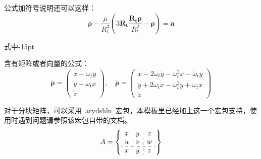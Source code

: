 公式加符号说明还可以这样：
\begin{equation}\label{eq:111}
\ddot{\boldsymbol{\rho}}-\frac{\mu}{R_{t}^{3}}\left( 3\mathbf{R_{t}}\frac{\mathbf{R_{t}\rho}}{R_{t}^{2}}-\boldsymbol{\rho}\right)=\mathbf{a}
\end{equation}
\begin{formulasymb}{式中}{-15pt}%
\end{formulasymb}

含有矩阵或者向量的公式：
\begin{equation}\label{eq:rho}
\dot{\boldsymbol{\rho}}=\left( \begin{array}{c}
\dot{x}-\omega_{t}y\\\dot{y}+\omega_{t}x\\\dot{z}
\end{array}\right) , \quad
\ddot{\boldsymbol{\rho}}=\left( \begin{array}{c}
\ddot{x}-2\omega_{t}\dot{y}-\omega_{t}^{2}x-\dot{\omega}_{t}y\\
\ddot{y}+2\omega_{t}\dot{x}-\omega_{t}^{2}y+\dot{\omega}_{t}x\\
\ddot{z}
\end{array}\right)
\end{equation}

对于分块矩阵，可以采用~arydshln~宏包，本模板里已经加上这一个宏包支持，使用时遇到问题请参照该宏包自带的文档。
\begin{equation}
A = \left\{ \begin{array}{cc:c} %
 x & y & z \\
 u & v & w \\ \hdashline   %
 x & y & z
 \end{array} \right\}
 \end{equation}


